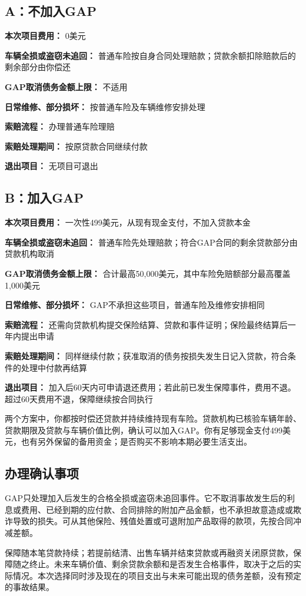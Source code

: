 \documentclass[UTF8,fontset=none,11pt,a4paper]{ctexart}
\begin{document}
\subsection*{A：不加入GAP}
\textbf{本次项目费用：} 0美元


\textbf{车辆全损或盗窃未追回：} 普通车险按自身合同处理赔款；贷款余额扣除赔款后的剩余部分由你偿还


\textbf{GAP取消债务金额上限：} 不适用


\textbf{日常维修、部分损坏：} 按普通车险及车辆维修安排处理


\textbf{索赔流程：} 办理普通车险理赔


\textbf{索赔处理期间：} 按原贷款合同继续付款


\textbf{退出项目：} 无项目可退出


\subsection*{B：加入GAP}
\textbf{本次项目费用：} 一次性499美元，从现有现金支付，不加入贷款本金


\textbf{车辆全损或盗窃未追回：} 普通车险先处理赔款；符合GAP合同的剩余贷款部分由贷款机构取消


\textbf{GAP取消债务金额上限：} 合计最高50,000美元，其中车险免赔额部分最高覆盖1,000美元


\textbf{日常维修、部分损坏：} GAP不承担这些项目，普通车险及维修安排相同


\textbf{索赔流程：} 还需向贷款机构提交保险结算、贷款和事件证明；保险最终结算后一年内提出申请


\textbf{索赔处理期间：} 同样继续付款；获准取消的债务按损失发生日记入贷款，符合条件的处理中付款再结算


\textbf{退出项目：} 加入后60天内可申请退还费用；若此前已发生保障事件，费用不退。超过60天费用不退，保障继续按合同执行


两个方案中，你都按时偿还贷款并持续维持现有车险。贷款机构已核验车辆年龄、贷款期限及贷款与车辆价值比例，确认可以加入GAP。你有足够现金支付499美元，也有另外保留的备用资金；是否购买不影响本期必要生活支出。


\subsection*{办理确认事项}
GAP只处理加入后发生的合格全损或盗窃未追回事件。它不取消事故发生后的利息或费用、已经到期的应付款、合同排除的附加产品金额，也不承担故意造成或欺诈导致的损失。可从其他保险、残值处置或可退附加产品取得的款项，先按合同冲减差额。


保障随本笔贷款持续；若提前结清、出售车辆并结束贷款或再融资关闭原贷款，保障随之终止。未来车辆价值、剩余贷款余额和是否发生合格事件，取决于之后的实际情况。本次选择同时涉及现在的项目支出与未来可能出现的债务差额，没有预定的事故结果。
\end{document}
